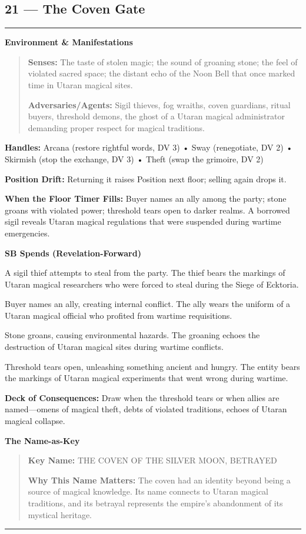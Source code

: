 \documentclass[18pt, letterpaper, twoside]{article}
\newenvironment{floorbox}[1]{%
    \begin{center}
    \begin{minipage}{0.95\textwidth}
    \subsection*{#1}
    \vspace{-0.5em}
    \rule{\textwidth}{0.5pt}
    \vspace{0.5em}
}{%
    \vspace{0.5em}
    \rule{\textwidth}{0.5pt}
    \end{minipage}
    \end{center}
}
\newenvironment{gmnote}[1]{%
    \vspace{0.5em}
    \noindent\textbf{#1}
    \begin{quote}
}{%
    \end{quote}
    \vspace{0.5em}
}
\newcommand{\handles}[1]{\noindent\textbf{Handles:} #1\par}
\newcommand{\sbitem}[2]{\item[#1 SB:] #2}
\newcommand{\deckdraw}[1]{\noindent\textbf{Deck of Consequences:} #1\par}
\newcommand{\keyname}[1]{\noindent\textbf{Key Name:} #1\par}
\newcommand{\nameimportance}[1]{\noindent\textbf{Why This Name Matters:} #1\par}
\begin{document}
\begin{floorbox}{21 --- The Coven Gate}
\begin{gmnote}{Environment \& Manifestations}
\textbf{Senses:} The taste of stolen magic; the sound of groaning stone; the feel of violated sacred space; the distant echo of the Noon Bell that once marked time in Utaran magical sites.

\textbf{Adversaries/Agents:} Sigil thieves, fog wraiths, coven guardians, ritual buyers, threshold demons, the ghost of a Utaran magical administrator demanding proper respect for magical traditions.
\end{gmnote}

\handles{Arcana (restore rightful words, DV 3) • Sway (renegotiate, DV 2) • Skirmish (stop the exchange, DV 3) • Theft (swap the grimoire, DV 2)}

\textbf{Position Drift:} Returning it raises Position next floor; selling again drops it.

\textbf{When the Floor Timer Fills:} Buyer names an ally among the party; stone groans with violated power; threshold tears open to darker realms. A borrowed sigil reveals Utaran magical regulations that were suspended during wartime emergencies.

\textbf{SB Spends (Revelation-Forward)}
\begin{description}[leftmargin=*, style=unboxed]
    \sbitem{1}{A sigil thief attempts to steal from the party. The thief bears the markings of Utaran magical researchers who were forced to steal during the Siege of Ecktoria.}
    \sbitem{2}{Buyer names an ally, creating internal conflict. The ally wears the uniform of a Utaran magical official who profited from wartime requisitions.}
    \sbitem{3}{Stone groans, causing environmental hazards. The groaning echoes the destruction of Utaran magical sites during wartime conflicts.}
    \sbitem{4+}{Threshold tears open, unleashing something ancient and hungry. The entity bears the markings of Utaran magical experiments that went wrong during wartime.}
\end{description}

\deckdraw{Draw when the threshold tears or when allies are named---omens of magical theft, debts of violated traditions, echoes of Utaran magical collapse.}

\begin{gmnote}{The Name-as-Key}
\keyname{THE COVEN OF THE SILVER MOON, BETRAYED}
\nameimportance{The coven had an identity beyond being a source of magical knowledge. Its name connects to Utaran magical traditions, and its betrayal represents the empire's abandonment of its mystical heritage.}


\end{gmnote}
\end{floorbox}
\end{document}
